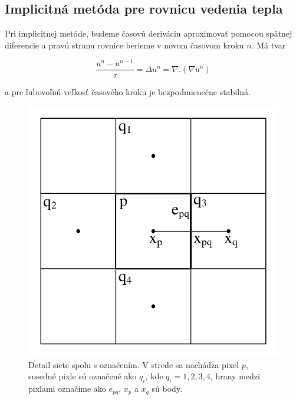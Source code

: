 \documentclass[a4paper,11pt,oneside]{article}%
\begin{document}

\subsection{Implicitná metóda pre rovnicu vedenia tepla}

Pri implicitnej metóde, budeme časovú deriváciu aproximovať pomocou spätnej diferencie a pravú stranu rovnice berieme v novom časovom kroku $n$. Má tvar

\begin{equation} \label{eq:ihe}
\frac{u^n - u^{n-1}}{\tau} = \Delta u^n = \nabla . (\nabla u^n)
\end{equation}

a pre ľubovoľnú veľkosť časového kroku je bezpodmienečne stabilná. 

\begin{figure}[h!]
 \begin{center} 
 \includegraphics[scale=0.40]{pics/hrany1.pdf}
\caption{Detail siete spolu s označením. V strede sa nachádza pixel $p$, susedné pixle sú označené ako $q_i$, kde $q_i = 1, 2, 3, 4$, hrany medzi pixlami označíme ako $e_{pq}$, $x_p$ a $x_q$ sú body. }
\label{fig:hrany}
\end{center} 
\end{figure}
\end{document}
